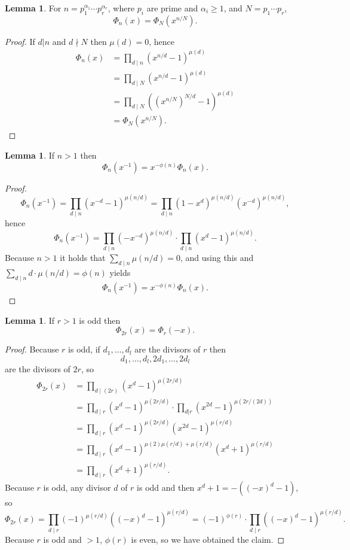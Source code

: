 \documentclass{article}
\theoremstyle{definition}
\newtheorem{lemma}[theorem]{Lemma}
\theoremstyle{definition}
\begin{document}
\begin{lemma}
For $n=p_1^{\alpha_1} \cdots p_r^{\alpha_r}$, where $p_i$ are prime and $\alpha_i \geq 1$, and
$N=p_1 \cdots p_r$,
\[
\Phi_n(x) = \Phi_N(x^{n/N}).
\]
\label{radical}
\end{lemma}
\begin{proof}
If $d|n$ and $d \nmid N$ then $\mu(d)=0$, hence
\begin{align*}
\Phi_n(x)&=\prod_{d \mid n} (x^{n/d}-1)^{\mu(d)}\\
&=\prod_{d \mid N} (x^{n/d}-1)^{\mu(d)}\\
&=\prod_{d \mid N} ((x^{n/N})^{N/d}-1)^{\mu(d)}\\
&=\Phi_N(x^{n/N}).
\end{align*}
\end{proof}


\begin{lemma}
If $n > 1$ then 
\[
 \Phi_n(x^{-1}) =x^{-\phi(n)} \Phi_n(x).
\]
\label{reciprocal}
\end{lemma}
\begin{proof}
\[
\Phi_n(x^{-1}) = \prod_{d \mid n} (x^{-d}-1)^{\mu(n/d)} = \prod_{d \mid n} (1-x^d)^{\mu(n/d)} (x^{-d})^{\mu(n/d)},
\]
hence
\[
\Phi_n(x^{-1}) = \prod_{d \mid n} (-x^{-d})^{\mu(n/d)} \cdot \prod_{d \mid n} (x^d-1)^{\mu(n/d)}.
\]
Because $n>1$ it holds that $\sum_{d \mid n} \mu(n/d) = 0$, and using this and
$\sum_{d \mid n} d\cdot \mu(n/d) = \phi(n)$ yields
\[
\Phi_n(x^{-1}) = x^{-\phi(n)} \Phi_n(x).
\]
\end{proof}



\begin{lemma}
If $r>1$ is odd then
\[
\Phi_{2r}(x) = \Phi_r(-x).
\]
\label{twiceodd}
\end{lemma}
\begin{proof}
Because $r$ is odd, if $d_1,\ldots,d_l$ are the divisors of $r$ then
\[
d_1,\ldots,d_l,2d_1,\ldots,2d_l
\]
 are the divisors of $2r$, so
\begin{align*}
\Phi_{2r}(x)&=\prod_{d \mid (2r)} (x^d-1)^{\mu(2r/d)}\\
&=\prod_{d \mid r} (x^d-1)^{\mu(2r/d)} \cdot \prod_{d|r} (x^{2d}-1)^{\mu(2r/(2d))}\\
&=\prod_{d \mid r} (x^d-1)^{\mu(2r/d)} (x^{2d}-1)^{\mu(r/d)}\\
&=\prod_{d \mid r} (x^d-1)^{\mu(2) \mu(r/d)+\mu(r/d)} (x^d+1)^{\mu(r/d)}\\
&=\prod_{d \mid r} (x^d+1)^{\mu(r/d)}.
\end{align*}
Because $r$ is odd, any divisor $d$ of $r$ is odd and then $x^d+1 = -((-x)^d-1)$, so
\[
\Phi_{2r}(x) = \prod_{d \mid r} (-1)^{\mu(r/d)} ((-x)^d-1)^{\mu(r/d)}
=(-1)^{\phi(r)} \cdot \prod_{d \mid r} ((-x)^d-1)^{\mu(r/d)}.
\] 
Because $r$ is odd and $>1$, $\phi(r)$ is even, so
we have obtained the claim.
\end{proof}
\end{document}
